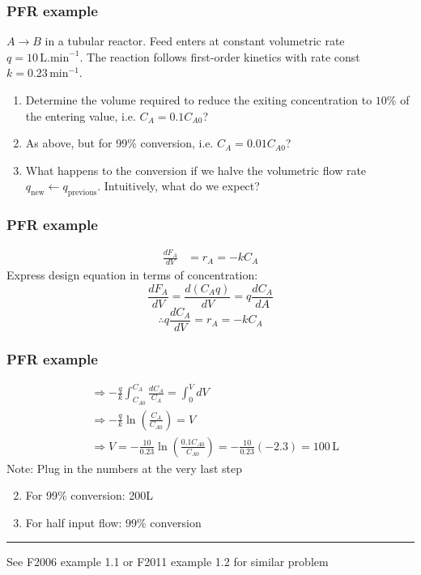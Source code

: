 \begin{frame}\frametitle{PFR example}
	$A\longrightarrow B$ in a tubular reactor. Feed enters at constant volumetric rate $q = 10\,\text{L.min}^{-1}$. The reaction follows first-order kinetics with rate const $k = 0.23\,\text{min}^{-1}$. 
	\vspace{12pt}
	\begin{enumerate}
		\item	Determine the volume required to reduce the exiting concentration to $10\%$ of the entering value, i.e. $C_A = 0.1 C_{A0}$?
		\item	As above, but for 99\% conversion, i.e. $C_A = 0.01 C_{A0}$?
		\item	What happens to the conversion if we halve the volumetric flow rate $q_\text{new} \leftarrow q_\text{previous}$. Intuitively, what do we expect?
	\end{enumerate}
\end{frame}

\begin{frame}\frametitle{PFR example}
	\begin{align*}
		\frac{dF_A}{dV} &= r_A = -kC_A
	\end{align*}
	Express design equation in terms of concentration: 
	$$\frac{dF_A}{dV} = \frac{d(C_Aq)}{dV} = q\frac{dC_A}{dA}$$ 
	$$\therefore q\frac{dC_A}{dV} = r_A = -kC_A$$
\end{frame}

\begin{frame}\frametitle{PFR example}
	\begin{align*}
		&\Rightarrow -\frac{q}{k}\int_{C_{A0}}^{C_A}\frac{dC_A}{C_A} = \int_0^VdV\\
		&\Rightarrow -\frac{q}{k}\ln\left(\frac{C_A}{C_{A0}} \right) = V\\
		&\Rightarrow V = -\frac{10}{0.23}\ln\left(\frac{0.1C_{A0}}{C_{A0}} \right) = -\frac{10}{0.23}(-2.3) = 100\,\text{L}
	\end{align*}
	Note: Plug in the numbers at the very last step
	\begin{enumerate}
		\setcounter{enumi}{1}
		\item	For 99\% conversion: 200L
		\item	For half input flow: 99\% conversion {\color{myGreen}{\small (increased!)}}
	\end{enumerate}
	\vspace{4pt}
	\hrule
	\vspace{4pt}
	\scriptsize See F2006 example 1.1 or F2011 example 1.2 for similar problem
\end{frame}


